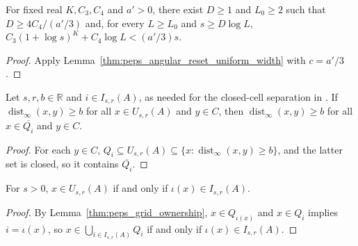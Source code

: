 \begin{lemma}
    \label{thm:peps_annular_reset_width}
    \leanok
    For fixed real $K,C_3,C_4$ and $a'>0$, there exist $D\ge1$ and $L_0\ge2$
    such that $D\ge4C_4/(a'/3)$ and, for every $L\ge L_0$ and $s\ge D\log L$,
    $C_3(1+\log s)^K+C_4\log L<(a'/3)s$.
\end{lemma}
\begin{proof}
    \leanok
    Apply Lemma~\ref{thm:peps_angular_reset_uniform_width} with $c=a'/3$.
\end{proof}

\begin{lemma}
    \label{thm:peps_selected_cell_closure_clearance}
    \leanok
    Let $s,r,b\in\mathbb R$ and $i\in I_{s,r}(A)$, as needed for the closed-cell
    separation in \cite[Lemma~3.2 and Proposition~3.4]{OpenAI2026PolynomialPEPS}.
    If $\operatorname{dist}_\infty(x,y)\ge b$ for all $x\in U_{s,r}(A)$ and
    $y\in C$, then $\operatorname{dist}_\infty(x,y)\ge b$ for all
    $x\in\overline{Q_i}$ and $y\in C$.
\end{lemma}
\begin{proof}
    \leanok
    For each $y\in C$, $Q_i\subseteq U_{s,r}(A)\subseteq\{x:\operatorname{dist}_\infty(x,y)\ge b\}$,
    and the latter set is closed, so it contains $\overline{Q_i}$.
\end{proof}

\begin{lemma}
    \label{thm:peps_selected_cell_owner}
    \leanok
    For $s>0$, $x\in U_{s,r}(A)$ if and only if $\iota(x)\in I_{s,r}(A)$.
\end{lemma}
\begin{proof}
    \leanok
    By Lemma~\ref{thm:peps_grid_ownership}, $x\in Q_{\iota(x)}$ and $x\in Q_i$
    implies $i=\iota(x)$, so $x\in\bigcup_{i\in I_{s,r}(A)}Q_i$ if and only if
    $\iota(x)\in I_{s,r}(A)$.
\end{proof}

